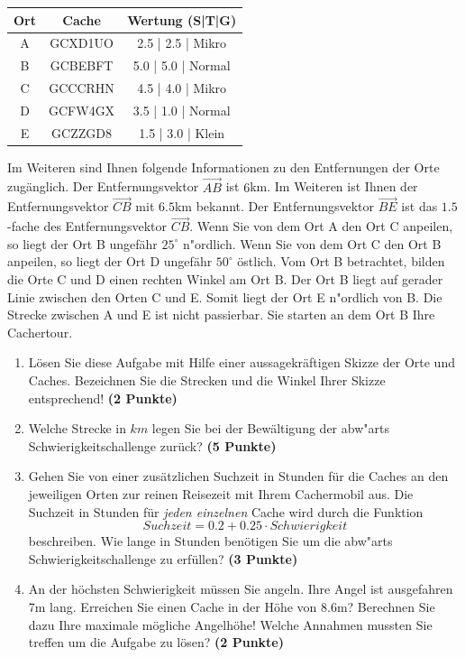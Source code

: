 \documentclass[a4paper, 9pt]{scrartcl}\usepackage[]{graphicx}\usepackage[]{xcolor}
\begin{document}
\begin{center}
  \begin{tabular}{ ccc }
    \toprule
    Ort & Cache & Wertung (S|T|G) \\
    \midrule
    A & GCXD1UO & 2.5 | 2.5 | Mikro \\
    B & GCBEBFT & 5.0 | 5.0 | Normal \\ 
    C & GCCCRHN & 4.5 | 4.0 | Mikro \\ 
    D & GCFW4GX & 3.5 | 1.0 | Normal \\ 
    E & GCZZGD8 & 1.5 | 3.0 | Klein \\     
 \bottomrule
\end{tabular}
\end{center}

Im Weiteren sind Ihnen folgende Informationen zu den Entfernungen der Orte
zug{\"a}nglich. Der Entfernungsvektor $\overrightarrow{AB}$ ist
$6$km. Im Weiteren ist Ihnen der Entfernungsvektor
$\overrightarrow{CB}$ mit $6.5$km bekannt. Der
Entfernungsvektor $\overrightarrow{BE}$ ist das $1.5$-fache
des Entfernungsvektor $\overrightarrow{CB}$. Wenn Sie von dem Ort A den Ort
C anpeilen, so liegt der Ort B ungef{\"a}hr $25^\circ$
n{"o}rdlich. Wenn Sie von dem Ort C den Ort B anpeilen, so liegt
der Ort D ungef{\"a}hr $50^\circ$ {\"o}stlich. Vom Ort B
betrachtet, bilden die Orte C und D einen rechten Winkel am Ort B. Der Ort
B liegt auf gerader Linie zwischen den Orten C und E. Somit liegt der Ort E
n{"o}rdlich von B. Die Strecke zwischen A und E ist nicht
passierbar. Sie starten an dem Ort B Ihre Cachertour. \\

\begin{enumerate}
\item L{\"o}sen Sie diese Aufgabe mit Hilfe einer aussagekr{\"a}ftigen Skizze der
  Orte und Caches. Bezeichnen Sie die Strecken und die Winkel Ihrer Skizze
  entsprechend! \textbf{(2 Punkte)}
\item Welche Strecke in $km$ legen Sie bei der Bew{\"a}ltigung der
  abw{"a}rts Schwierigkeitschallenge zur{\"u}ck? \textbf{(5
    Punkte)}
\item Gehen Sie von einer zus{\"a}tzlichen Suchzeit in Stunden f{\"u}r die
  Caches an den jeweiligen Orten zur reinen Reisezeit mit Ihrem Cachermobil
  aus. Die Suchzeit in Stunden f{\"u}r \textit{jeden einzelnen} Cache wird durch die
  Funktion
  \begin{equation*}
    Suchzeit = 0.2 + 0.25 \cdot Schwierigkeit
  \end{equation*}  
  beschreiben.  Wie lange in Stunden ben{\"o}tigen Sie um die
  abw{"a}rts Schwierigkeitschallenge zu erf{\"u}llen? \textbf{(3 Punkte)}
\item An der h{\"o}chsten Schwierigkeit m{\"u}ssen Sie angeln. Ihre Angel ist
  ausgefahren 7m lang. Erreichen Sie einen Cache in der H{\"o}he
  von 8.6m?  Berechnen Sie dazu Ihre maximale m{\"o}gliche
  Angelh{\"o}he! Welche Annahmen mussten Sie treffen um die Aufgabe zu l{\"o}sen? \textbf{(2 Punkte)} 
\end{enumerate}
\end{document}
